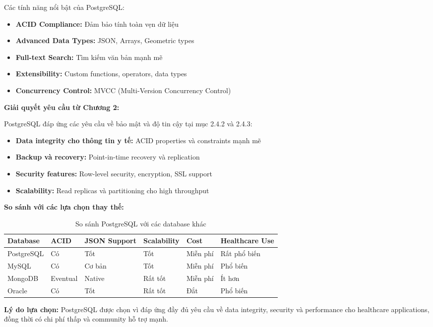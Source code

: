 \documentclass[../DoAn.tex]{subfiles}
\begin{document}
Các tính năng nổi bật của PostgreSQL:
\begin{itemize}
    \item \textbf{ACID Compliance:} Đảm bảo tính toàn vẹn dữ liệu
    \item \textbf{Advanced Data Types:} JSON, Arrays, Geometric types
    \item \textbf{Full-text Search:} Tìm kiếm văn bản mạnh mẽ
    \item \textbf{Extensibility:} Custom functions, operators, data types
    \item \textbf{Concurrency Control:} MVCC (Multi-Version Concurrency Control)
\end{itemize}

\textbf{Giải quyết yêu cầu từ Chương 2:}

PostgreSQL đáp ứng các yêu cầu về bảo mật và độ tin cậy tại mục 2.4.2 và 2.4.3:
\begin{itemize}
    \item \textbf{Data integrity cho thông tin y tế:} ACID properties và constraints mạnh mẽ
    \item \textbf{Backup và recovery:} Point-in-time recovery và replication
    \item \textbf{Security features:} Row-level security, encryption, SSL support
    \item \textbf{Scalability:} Read replicas và partitioning cho high throughput
\end{itemize}

\textbf{So sánh với các lựa chọn thay thế:}

\begin{table}[H]
\centering
\begin{tabular}{|p{2.5cm}|p{2cm}|p{2cm}|p{2cm}|p{2cm}|p{2cm}|}
\hline
\textbf{Database} & \textbf{ACID} & \textbf{JSON Support} & \textbf{Scalability} & \textbf{Cost} & \textbf{Healthcare Use} \\
\hline
PostgreSQL & Có & Tốt & Tốt & Miễn phí & Rất phổ biến \\
\hline
MySQL & Có & Cơ bản & Tốt & Miễn phí & Phổ biến \\
\hline
MongoDB & Eventual & Native & Rất tốt & Miễn phí & Ít hơn \\
\hline
Oracle & Có & Tốt & Rất tốt & Đắt & Phổ biến \\
\hline
\end{tabular}
\caption{So sánh PostgreSQL với các database khác}
\end{table}

\textbf{Lý do lựa chọn:} PostgreSQL được chọn vì đáp ứng đầy đủ yêu cầu về data integrity, security và performance cho healthcare applications, đồng thời có chi phí thấp và community hỗ trợ mạnh.
\end{document}
